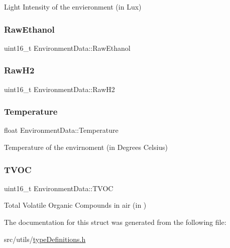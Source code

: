 Light Intensity of the envieronment (in Lux) \mbox{\label{structEnvironmentData_a3c949734838b0bc862b8f7449b6df41c}} 
\subsubsection{\texorpdfstring{Raw\+Ethanol}{RawEthanol}}
{\footnotesize\ttfamily uint16\+\_\+t Environment\+Data\+::\+Raw\+Ethanol}

\mbox{\label{structEnvironmentData_a89c96958697dd39ee2e41289debcd8a5}} 
\subsubsection{\texorpdfstring{Raw\+H2}{RawH2}}
{\footnotesize\ttfamily uint16\+\_\+t Environment\+Data\+::\+Raw\+H2}

\mbox{\label{structEnvironmentData_a5c8f919b34fe673a71726053d05cb775}} 
\subsubsection{\texorpdfstring{Temperature}{Temperature}}
{\footnotesize\ttfamily float Environment\+Data\+::\+Temperature}

Temperature of the envirnoment (in Degrees Celsius) \mbox{\label{structEnvironmentData_aae4ac3338a76432de00582ba5af01a45}} 
\subsubsection{\texorpdfstring{T\+V\+OC}{TVOC}}
{\footnotesize\ttfamily uint16\+\_\+t Environment\+Data\+::\+T\+V\+OC}

Total Volatile Organic Compounds in air (in ) 

The documentation for this struct was generated from the following file\+:\begin{DoxyCompactItemize}
\item 
src/utils/\hyperlink{typeDefinitions_8h}{type\+Definitions.\+h}\end{DoxyCompactItemize}
